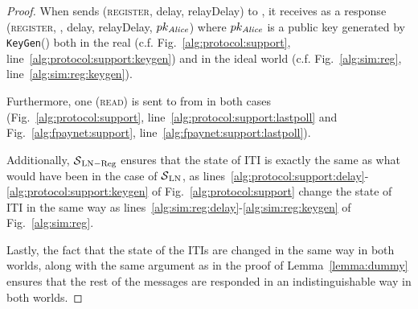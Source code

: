 \begin{proof}
  When \environment{} sends (\textsc{register}, delay, relayDelay) to
  \alice{}, it receives as a response (\textsc{register}, \alice, delay,
  relayDelay, $pk_{\mathit{Alice}}$) where $pk_{\mathit{Alice}}$ is a public key generated by
  \texttt{KeyGen}() both in the real (c.f. Fig.~\ref{alg:protocol:support},
  line~\ref{alg:protocol:support:keygen}) and in the ideal world (c.f.
  Fig.~\ref{alg:sim:reg}, line~\ref{alg:sim:reg:keygen}).

  Furthermore, one (\textsc{read}) is sent to \ledger{} from \alice{} in both
  cases (Fig.~\ref{alg:protocol:support},
  line~\ref{alg:protocol:support:lastpoll} and Fig.~\ref{alg:fpaynet:support},
  line~\ref{alg:fpaynet:support:lastpoll}).

  Additionally, $\mathcal{S}{}_{\mathrm{LN - Reg}}$ ensures that the state of
  \alice{} ITI is exactly the same as what would have been in the case of
  $\mathcal{S}{}_{\mathrm{LN}}$, as
  lines~\ref{alg:protocol:support:delay}-\ref{alg:protocol:support:keygen} of
  Fig.~\ref{alg:protocol:support} change the state of \alice{} ITI in the same
  way as lines~\ref{alg:sim:reg:delay}-\ref{alg:sim:reg:keygen} of
  Fig.~\ref{alg:sim:reg}.

  Lastly, the fact that the state of the \alice{} ITIs are changed in the same
  way in both worlds, along with the same argument as in the proof of
  Lemma~\ref{lemma:dummy} ensures that the rest of the messages are responded
  in an indistinguishable way in both worlds.
\end{proof}
